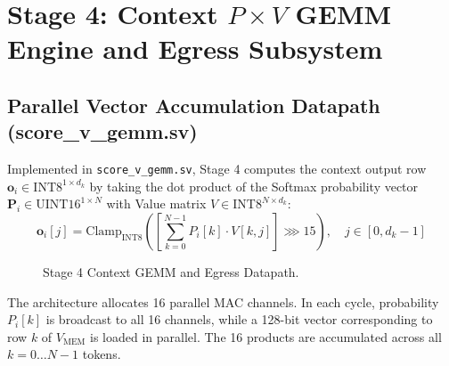 \chapter{Stage 4: Context $P \times V$ GEMM Engine and Egress Subsystem}
\label{chap:stage4_context_gemm}

\section{Parallel Vector Accumulation Datapath (score\_v\_gemm.sv)}
Implemented in \texttt{score\_v\_gemm.sv}, Stage 4 computes the context output row $\mathbf{o}_i \in \text{INT8}^{1 \times d_k}$ by taking the dot product of the Softmax probability vector $\mathbf{P}_i \in \text{UINT16}^{1 \times N}$ with Value matrix $V \in \text{INT8}^{N \times d_k}$:
\begin{equation}
    \mathbf{o}_i[j] = \text{Clamp}_{\text{INT8}} \left( \left[ \sum_{k=0}^{N-1} P_i[k] \cdot V[k, j] \right] \ggg 15 \right), \quad j \in [0, d_k-1]
\end{equation}

\begin{figure}[htbp]
    \centering
    \caption{Stage 4 Context GEMM and Egress Datapath.}
    \label{fig:stage4_datapath}
\end{figure}

The architecture allocates 16 parallel MAC channels. In each cycle, probability $P_i[k]$ is broadcast to all 16 channels, while a 128-bit vector corresponding to row $k$ of $V_{\text{MEM}}$ is loaded in parallel. The 16 products are accumulated across all $k = 0 \dots N-1$ tokens.

